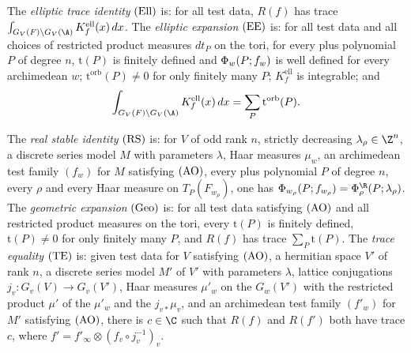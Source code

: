 \begin{definition}\label{pf:multnc:def-ell}
The \emph{elliptic trace identity} $\textup{(Ell)}$ is: for all test data, $R(f)$ has trace
$\int_{G_V(F)\backslash G_V(\A)}K^{\mathrm{ell}}_f(x)\,dx$. The \emph{elliptic expansion} $\textup{(EE)}$ is: for all
test data and all choices of restricted product measures $dt_P$ on the tori, for every plus polynomial $P$ of degree $n$,
$\mathrm{t}(P)$ is finitely defined and $\Phi_w(P;f_w)$ is well defined for every archimedean $w$;
$\mathrm{t}^{\mathrm{orb}}(P)\ne0$ for only finitely many $P$; $K^{\mathrm{ell}}_f$ is integrable; and
\begin{equation}\label{pf:multnc:eq-ellpart}
\int_{G_V(F)\backslash G_V(\A)}K^{\mathrm{ell}}_f(x)\,dx=\sum_P\mathrm{t}^{\mathrm{orb}}(P).
\end{equation}
\end{definition}

\begin{definition}\label{pf:multnc:def-derived}
The \emph{real stable identity} $\textup{(RS)}$ is: for $V$ of odd rank $n$, strictly decreasing $\lambda_\rho\in\Z^n$, a
discrete series model $M$ with parameters $\lambda$, Haar measures $\mu_w$, an archimedean test family $(f_w)$ for $M$
satisfying $\textup{(AO)}$, every plus polynomial $P$ of degree $n$, every $\rho$ and every Haar measure on
$T_P(F_{w_\rho})$, one has $\multncPhi_{w_\rho}(P;f_{w_\rho})=\multncPhi^{\R}_\rho(P;\lambda_\rho)$. The \emph{geometric
expansion} $\textup{(Geo)}$ is: for all test data satisfying $\textup{(AO)}$ and all restricted product measures on the
tori, every $\mathrm{t}(P)$ is finitely defined, $\mathrm{t}(P)\ne0$ for only finitely many $P$, and $R(f)$ has trace
$\sum_P\mathrm{t}(P)$. The \emph{trace equality} $\textup{(TE)}$ is: given test data for $V$ satisfying $\textup{(AO)}$, a
hermitian space $V'$ of rank $n$, a discrete series model $M'$ of $V'$ with parameters $\lambda$, lattice conjugations
$j_v\colon G_v(V)\to G_v(V')$, Haar measures $\mu'_w$ on the $G_w(V')$ with the restricted product $\mu'$ of the $\mu'_w$
and the $j_{v*}\mu_v$, and an archimedean test family $(f'_w)$ for $M'$ satisfying $\textup{(AO)}$, there is $c\in\C$
such that $R(f)$ and $R(f')$ both have trace $c$, where $f'=f'_\infty\otimes(f_v\circ j_v^{-1})_v$.
\end{definition}

